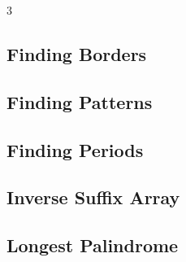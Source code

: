 \documentclass[8pt]{extarticle}
\begin{document}
\begin{multicols*}{3}
\subsection{Finding Borders}
\begin{caixaenunciado}

\end{caixaenunciado}
\vspace{0.3cm}


\subsection{Finding Patterns}
\begin{caixaenunciado}

\end{caixaenunciado}
\vspace{0.3cm}


\subsection{Finding Periods}
\begin{caixaenunciado}

\end{caixaenunciado}
\vspace{0.3cm}


\subsection{Inverse Suffix Array}
\begin{caixaenunciado}

\end{caixaenunciado}
\vspace{0.3cm}


\subsection{Longest Palindrome}
\begin{caixaenunciado}

\end{caixaenunciado}
\vspace{0.3cm}



\end{multicols*}
\end{document}
